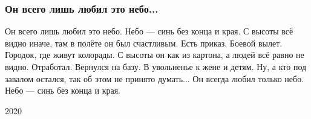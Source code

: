  
 
 

\subsubsection{Он всего лишь любил это небо...}
\label{sec:poetry.rus.dnr.vladislav_rusanov.eto_nebo}


Он всего лишь любил это небо.
Небо --- синь без конца и края.
С высоты всё видно иначе,
там в полёте он был счастливым.
Есть приказ. Боевой вылет.
Городок, где живут колорады.
С высоты он как из картона,
а людей всё равно не видно.
Отработал. Вернулся на базу.
В увольненье к жене и детям.
Ну, а кто под завалом остался,
так об этом не принято думать...
Он всегда любил только небо.
Небо --- синь без конца и края.

2020
